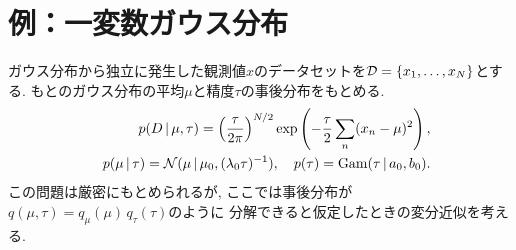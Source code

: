 \section{例：一変数ガウス分布}
ガウス分布から独立に発生した観測値$x$のデータセットを${\cal D}=\{x_1,\ldots,x_N\}$とする.
もとのガウス分布の平均$\mu$と精度$\tau$の事後分布をもとめる.
\begin{eqnarray*}&&
p(D\,|\,\mu,\tau)=\left(\frac{\tau}{2\pi}\right)^{N/2} \exp\left(-\frac{\tau}{2}\sum_n (x_n-\mu)^2\right),
\\&&
p(\mu\,|\,\tau)={\cal N}(\mu\,|\,\mu_0, (\lambda_0\tau)^{-1}), \quad p(\tau)=\mathop{\mathrm{Gam}}\nolimits(\tau\,|\,a_0, b_0).
\end{eqnarray*}
この問題は厳密にもとめられるが,
ここでは事後分布が$q(\mu,\tau)=q_\mu(\mu)\,q_\tau(\tau)$のように
分解できると仮定したときの変分近似を考える.

